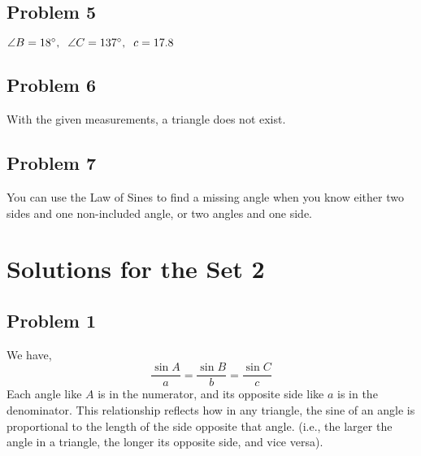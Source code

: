 \documentclass[12pt]{article}
\begin{document}
\subsection*{Problem 5}
\(\angle B=18^{\circ}, \hspace{0.2cm} \angle C=137^{\circ}, \hspace{0.2cm} c=17.8\)
\subsection*{Problem 6}
With the given measurements, a triangle does not exist.
\subsection*{Problem 7}
You can use the Law of Sines to find a missing angle when you know either two sides and one non-included angle, or two angles and one side.

\section*{Solutions for the Set 2}
\subsection*{Problem 1}
We have,
\[\dfrac{\sin A}{a}=\dfrac{\sin B}{b}=\dfrac{\sin C}{c}\]
Each angle like \(A\) is in the numerator, and its opposite side like \(a\) is in the denominator. This relationship reflects how in any triangle, the sine of an angle is proportional to the length of the side opposite that angle.
 (i.e., the larger the angle in a triangle, the longer its opposite side, and vice versa).
\end{document}
